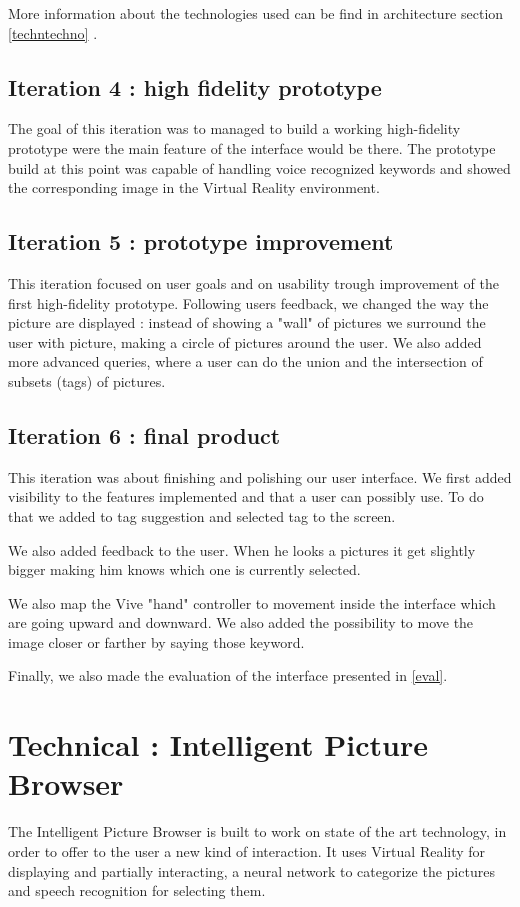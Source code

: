 \documentclass[11pt,a4paper]{article}
\begin{document}
More information about the technologies used can be find in architecture section \ref{techntechno} .

\subsection{Iteration 4 : high fidelity prototype}

The goal of this iteration was to managed to build a working high-fidelity prototype were the main feature of the interface would be there.
The prototype build at this point was capable of handling voice recognized keywords and showed the corresponding image in the Virtual Reality environment.

\subsection{Iteration 5 : prototype improvement}

This iteration focused on user goals and on usability trough improvement of the first high-fidelity prototype. Following users feedback, we changed the way the picture are displayed : instead of showing a "wall" of pictures we surround the user with picture, making a circle of pictures around the user.
We also added more advanced queries, where a user can do the union and the intersection of subsets (tags) of pictures.

\subsection{Iteration 6 : final product}

This iteration was about finishing and polishing our user interface. We first added visibility to the features implemented and that a user can possibly use. To do that we added to tag suggestion and selected tag to the screen.

We also added feedback to the user. When he looks a pictures it get slightly bigger making him knows which one is currently selected.

We also map the Vive "hand" controller to movement inside the interface which are going upward and downward. We also added the possibility to move the image closer or farther by saying those keyword. 

Finally, we also made the evaluation of the interface presented in \ref{eval}.

\section{Technical : Intelligent Picture Browser}
The Intelligent Picture Browser is built to work on state of the art technology, in order to offer to the user a new kind of interaction.
It uses Virtual Reality for displaying and partially interacting, a neural network to categorize the pictures and speech recognition for selecting them.
\end{document}
